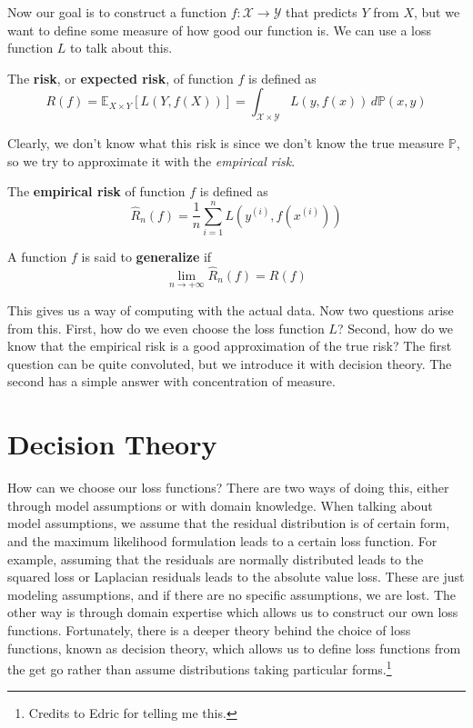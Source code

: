 \documentclass{article}
\begin{document}
  Now our goal is to construct a function $f: \mathcal{X} \rightarrow \mathcal{Y}$ that predicts $Y$ from $X$, but we want to define some measure of how good our function is. We can use a loss function $L$ to talk about this. 

  \begin{definition}[Risk]
    The \textbf{risk}, or \textbf{expected risk}, of function $f$ is defined as 
    \begin{equation}
      R(f) = \mathbb{E}_{X \times Y} [ L(Y, f(X))] = \int_{\mathcal{X} \times \mathcal{Y}} L(y, f(x)) \,d\mathbb{P}(x, y)
    \end{equation}
  \end{definition}

  Clearly, we don't know what this risk is since we don't know the true measure $\mathbb{P}$, so we try to approximate it with the \textit{empirical risk}. 

  \begin{definition}
    The \textbf{empirical risk} of function $f$ is defined as 
    \begin{equation}
      \hat{R}_n(f) = \frac{1}{n} \sum_{i=1}^n L(y^{(i)}, f(x^{(i)}))
    \end{equation}
  \end{definition}

  \begin{definition}[Generlize]
    A function $f$ is said to \textbf{generalize} if 
    \begin{equation}
      \lim_{n \rightarrow +\infty} \hat{R}_n (f) = R(f)
    \end{equation}
  \end{definition}

  This gives us a way of computing with the actual data. Now two questions arise from this. First, how do we even choose the loss function $L$? Second, how do we know that the empirical risk is a good approximation of the true risk? The first question can be quite convoluted, but we introduce it with decision theory. The second has a simple answer with concentration of measure.  

\section{Decision Theory}

  How can we choose our loss functions? There are two ways of doing this, either through model assumptions or with domain knowledge. When talking about model assumptions, we assume that the residual distribution is of certain form, and the maximum likelihood formulation leads to a certain loss function. For example, assuming that the residuals are normally distributed leads to the squared loss or Laplacian residuals leads to the absolute value loss. These are just modeling assumptions, and if there are no specific assumptions, we are lost. The other way is through domain expertise which allows us to construct our own loss functions. Fortunately, there is a deeper theory behind the choice of loss functions, known as decision theory, which allows us to define loss functions from the get go rather than assume distributions taking particular forms.\footnote{Credits to Edric for telling me this.}
\end{document}

